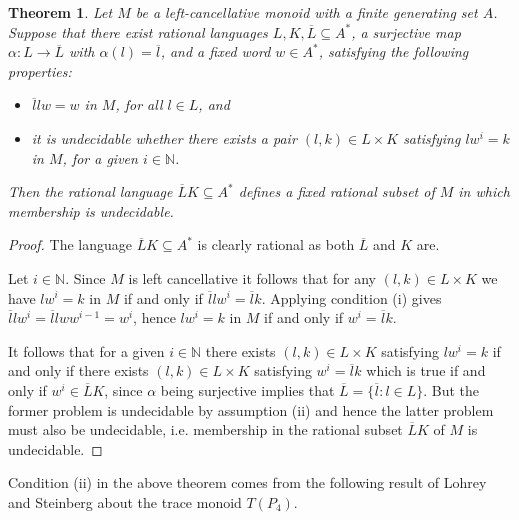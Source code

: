 \documentclass{amsart}
\newcommand{\N}{\mathbb{N}}
\theoremstyle{plain}
\newtheorem{theorem}{Theorem}[section]
\theoremstyle{definition}
\begin{document}
\begin{theorem}\label{thm: general theorem undecidability}
Let $M$
be a left-cancellative monoid with a finite generating set $A$. 
Suppose that there exist rational languages $L, K, \overline{L} \subseteq A^*$,   
a surjective map $\alpha: L \longrightarrow \overline{L}$ with $\alpha(l) = \overline{l}$, and a fixed word $w \in A^*$, satisfying the following properties:
\begin{itemize}
\item[(i)] $\overline{l} l w = w$ in $M$, for all $l \in L$, and
\item[(ii)] it is undecidable whether there exists a pair $(l,k) \in L \times K$ satisfying $lw^i = k$ in $M$, for a given $i \in \N$.
\end{itemize}
Then the rational language $\overline{L}K \subseteq A^*$ defines a fixed rational subset of $M$ in which membership is undecidable.
\end{theorem}
\begin{proof}
The language $\overline{L}K \subseteq A^*$ is clearly rational as both $\overline{L}$ and $K$ are. 

Let $i \in \mathbb{N}$. 
Since $M$ is left cancellative it follows
that for any  $(l,k) \in L \times K$ we have 
$lw^i = k$ in $M$ if and only if $\overline{l}lw^i = \overline{l}k$. 
Applying condition (i) gives $\overline{l}lw^i = \overline{l}lww^{i-1}  = w^i$, hence    
$lw^i = k$ in $M$ if and only if $w^i = \overline{l}k$.   

It follows that 
for a given $i \in \mathbb{N}$ 
there exists $(l,k) \in L \times K$ satisfying 
$lw^i = k$ if and only if there exists $(l,k) \in L \times K$ satisfying  
$w^i = \overline{l}k$ which is true if and only if $w^i \in \overline{L} K$,
since $\alpha$ being surjective implies that $\overline{L} = \{\overline{l} : l \in L \}$.    
But the former problem is undecidable by assumption (ii) and hence the latter problem must also be undecidable, i.e. membership in the rational subset $\overline{L}K$ of $M$ is undecidable. 
\end{proof}

Condition (ii) in the above theorem comes from the following result of Lohrey and Steinberg \cite{Lohrey2008} about the trace monoid $T(P_4)$.   
\end{document}
